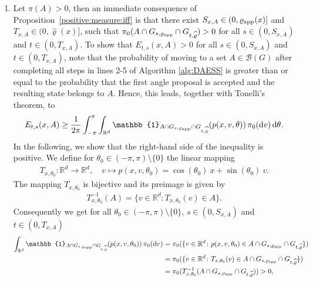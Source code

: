 \documentclass[sn-mathphys-num]{sn-jnl}%
\theoremstyle{thmstyleone}%
\theoremstyle{thmstyletwo}%
\theoremstyle{thmstylethree}%
\newcommand{\rhoapp}{\varrho_{{\rm app}}}
\newcommand{\change}[1]{\bgroup\color{black}#1\egroup}    %
\begin{document}
\begin{appendices}
\begin{enumerate}
    \item  
    Let $\pi(A)>0$, then an immediate consequence of Proposition~\ref{positive:measure:iff} is that there exist $S_{x,A}\in(0, \rhoapp(x)]$ and $T_{x,A}\in(0, \widehat{\varrho}(x)]$, such that $\pi_0(A\cap G_{s, \varrho_{\textmd{app}}}\cap G_{t, \widehat{\varrho}}) > 0$ for all $s\in(0, S_{x,A})$ and $t\in(0, T_{x,A})$. To show \change{that} $E_{t,s}(x,A)>0$ for all $s\in(0, S_{x,A})$ and $t\in(0, T_{x,A})$, note that the probability of moving to a set $A\in\mathcal{B}(G)$ after completing all steps in lines 2-5 of Algorithm \ref{alg:DAESS} is greater than or equal to the %
    probability \change{that the first angle proposal is accepted and the resulting state belongs to $A$.}
    Hence, this leads, together with \change{Tonelli’s theorem}, to   
    \[
       E_{t,s}(x,A)\geq \frac{1}{2\pi}\int_{-\pi}^{\pi}\int_{\mathbb R^d} \mathbb{1}_{A\cap G_{s,\varrho_{\textmd{app}}}\cap G_{t,\widehat{\varrho}}}(p(x,v,\theta)) \, \pi_0(\mathrm{d} v) \, \mathrm{d}\theta. 
    \]
    In the following, we show that the right-hand side of the inequality is positive. We define for $\theta_0\in(-\pi,\pi)\setminus\{0\}$ the linear mapping
    \begin{align*}
       T_{x,\theta_0}: \mathbb R^d \rightarrow \mathbb R^d, \quad v \mapsto p(x, v, \theta_0)=\cos(\theta_0) \ x + \sin(\theta_0)\ v.    
    \end{align*}
    The mapping $T_{x,\theta_0}$ is bijective and its preimage is given by 
    \begin{align}\label{inverse:mapping}
       T_{x,\theta_0}^{-1}(A)=\{v\in\mathbb R^d\colon T_{x,\theta_0}(v)\in A\}.
    \end{align}
    Consequently we get for all $\theta_0\in(-\pi,\pi)\setminus\{0\}$, $s\in(0, S_{x,A})$ and $t\in(0, T_{x,A})$   
    \begin{align*}
        \int_{\mathbb R^d} \mathbb{1}_{A\cap G_{s,\varrho_{\textmd{app}}}\cap G_{t,\widehat{\varrho}}}(p(x,v,\theta_0)) \, \pi_0(\mathrm{d} v)&=\pi_0(\{v\in\mathbb R^d\colon p(x, v, \theta_0)\in A\cap G_{s,\varrho_{\textmd{app}}}\cap G_{t,\widehat{\varrho}}\}) \\
        &=\pi_0(\{v\in\mathbb R^d\colon T_{x,\theta_0}(v)\in A\cap G_{s,\varrho_{\textmd{app}}}\cap G_{t,\widehat{\varrho}}\}) \\
        &= \pi_0(T_{x,\theta_0}^{-1}( A\cap G_{s,\varrho_{\textmd{app}}}\cap G_{t,\widehat{\varrho}})) >0,
    \end{align*}

\end{enumerate}
\end{appendices}
\end{document}
